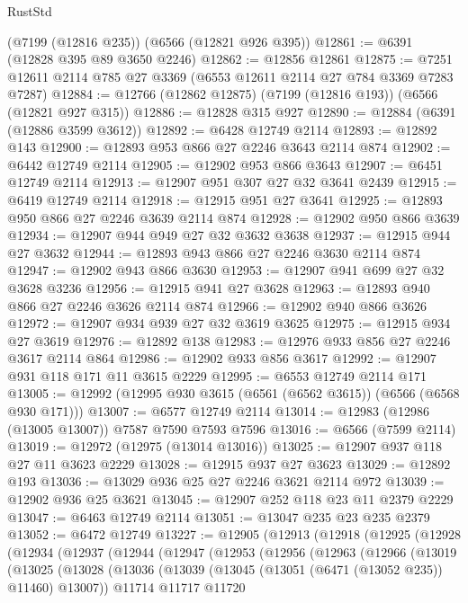 \begin{lexlean}{RustStd}
\begin{coremodule}
    (@7199 (@12816 @235))
    (@6566 (@12821 @926 @395))
@12861 := @6391 (@12828 @395 @89 @3650 @2246)
@12862 := @12856 @12861
@12875 := @7251 @12611 @2114 @785 @27 @3369 (@6553 @12611 @2114 @27 @784 @3369 @7283 @7287)
@12884 := @12766 (@12862 @12875) (@7199 (@12816 @193)) (@6566 (@12821 @927 @315))
@12886 := @12828 @315 @927
@12890 := @12884 (@6391 (@12886 @3599 @3612))
@12892 := @6428 @12749 @2114
@12893 := @12892 @143
@12900 := @12893 @953 @866 @27 @2246 @3643 @2114 @874
@12902 := @6442 @12749 @2114
@12905 := @12902 @953 @866 @3643
@12907 := @6451 @12749 @2114
@12913 := @12907 @951 @307 @27 @32 @3641 @2439
@12915 := @6419 @12749 @2114
@12918 := @12915 @951 @27 @3641
@12925 := @12893 @950 @866 @27 @2246 @3639 @2114 @874
@12928 := @12902 @950 @866 @3639
@12934 := @12907 @944 @949 @27 @32 @3632 @3638
@12937 := @12915 @944 @27 @3632
@12944 := @12893 @943 @866 @27 @2246 @3630 @2114 @874
@12947 := @12902 @943 @866 @3630
@12953 := @12907 @941 @699 @27 @32 @3628 @3236
@12956 := @12915 @941 @27 @3628
@12963 := @12893 @940 @866 @27 @2246 @3626 @2114 @874
@12966 := @12902 @940 @866 @3626
@12972 := @12907 @934 @939 @27 @32 @3619 @3625
@12975 := @12915 @934 @27 @3619
@12976 := @12892 @138
@12983 := @12976 @933 @856 @27 @2246 @3617 @2114 @864
@12986 := @12902 @933 @856 @3617
@12992 := @12907 @931 @118 @171 @11 @3615 @2229
@12995 := @6553 @12749 @2114 @171
@13005 := @12992 (@12995 @930 @3615 (@6561 (@6562 @3615)) (@6566 (@6568 @930 @171)))
@13007 := @6577 @12749 @2114
@13014 := @12983 (@12986 (@13005 @13007)) @7587 @7590 @7593 @7596
@13016 := @6566 (@7599 @2114)
@13019 := @12972 (@12975 (@13014 @13016))
@13025 := @12907 @937 @118 @27 @11 @3623 @2229
@13028 := @12915 @937 @27 @3623
@13029 := @12892 @193
@13036 := @13029 @936 @25 @27 @2246 @3621 @2114 @972
@13039 := @12902 @936 @25 @3621
@13045 := @12907 @252 @118 @23 @11 @2379 @2229
@13047 := @6463 @12749 @2114
@13051 := @13047 @235 @23 @235 @2379
@13052 := @6472 @12749
@13227 := @12905
    (@12913
      (@12918
        (@12925
          (@12928
            (@12934
              (@12937
                (@12944
                  (@12947
                    (@12953
                      (@12956
                        (@12963
                          (@12966
                            (@13019
                              (@13025
                                (@13028
                                  (@13036
                                    (@13039 (@13045 (@13051 (@6471 (@13052 @235)) @11460) @13007))
                                    @11714
                                    @11717
                                    @11720

\end{coremodule}
\end{lexlean}
